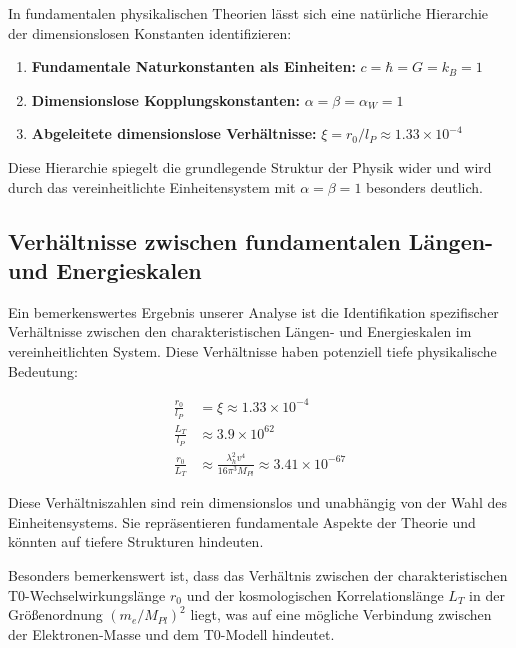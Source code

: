 \documentclass[12pt,a4paper]{article}
\begin{document}
	In fundamentalen physikalischen Theorien lässt sich eine natürliche Hierarchie der dimensionslosen Konstanten identifizieren:
	
	\begin{enumerate}[label=\arabic*.]
		\item \textbf{Fundamentale Naturkonstanten als Einheiten:} $c = \hbar = G = k_B = 1$
		\item \textbf{Dimensionslose Kopplungskonstanten:} $\alpha = \beta = \alpha_W = 1$
		\item \textbf{Abgeleitete dimensionslose Verhältnisse:} $\xi = r_0/l_P \approx 1.33 \times 10^{-4}$
	\end{enumerate}
	
	Diese Hierarchie spiegelt die grundlegende Struktur der Physik wider und wird durch das vereinheitlichte Einheitensystem mit $\alpha = \beta = 1$ besonders deutlich.
	
	\subsection{Verhältnisse zwischen fundamentalen Längen- und Energieskalen}
	
	Ein bemerkenswertes Ergebnis unserer Analyse ist die Identifikation spezifischer Verhältnisse zwischen den charakteristischen Längen- und Energieskalen im vereinheitlichten System. Diese Verhältnisse haben potenziell tiefe physikalische Bedeutung:
	
	\begin{tcolorbox}[colback=blue!5!white,colframe=blue!75!black,title=Fundamentale Verhältnisse im vereinheitlichten Einheitensystem]
		\begin{align}
			\frac{r_0}{l_P} &= \xi \approx 1.33 \times 10^{-4}\\
			\frac{L_T}{l_P} &\approx 3.9 \times 10^{62}\\
			\frac{r_0}{L_T} &\approx \frac{\lambda_h^2 v^4}{16\pi^3 M_{Pl}} \approx 3.41 \times 10^{-67}
		\end{align}
	\end{tcolorbox}
	
	Diese Verhältniszahlen sind rein dimensionslos und unabhängig von der Wahl des Einheitensystems. Sie repräsentieren fundamentale Aspekte der Theorie und könnten auf tiefere Strukturen hindeuten.
	
	Besonders bemerkenswert ist, dass das Verhältnis zwischen der charakteristischen T0-Wechselwirkungslänge $r_0$ und der kosmologischen Korrelationslänge $L_T$ in der Größenordnung $(m_e/M_{Pl})^2$ liegt, was auf eine mögliche Verbindung zwischen der Elektronen-Masse und dem T0-Modell hindeutet.
	
\end{document}
